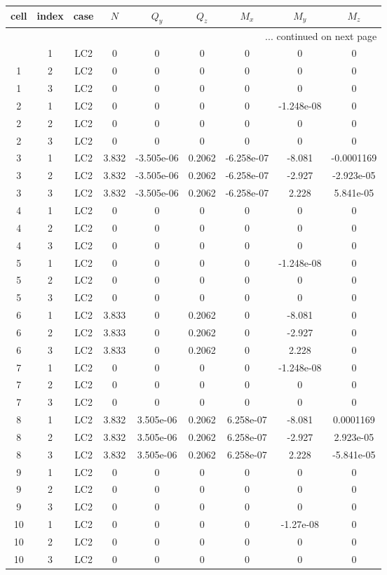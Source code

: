 \documentclass{article}%
\begin{document}
\begin{longtable}{| c c c | c c c c c c |}%
\hline%
cell&index&case&$N$&$Q_y$&$Q_z$&$M_x$&$M_y$&$M_z$\\%
\hline%
\endhead%
\hline%
\multicolumn{9}{r}{... continued on next page}\\%
\endfoot%
\hline%
\endlastfoot%
1&1&LC2&0&0&0&0&0&0\\%
1&2&LC2&0&0&0&0&0&0\\%
1&3&LC2&0&0&0&0&0&0\\%
2&1&LC2&0&0&0&0&{-}1.248e{-}08&0\\%
2&2&LC2&0&0&0&0&0&0\\%
2&3&LC2&0&0&0&0&0&0\\%
3&1&LC2&3.832&{-}3.505e{-}06&0.2062&{-}6.258e{-}07&{-}8.081&{-}0.0001169\\%
3&2&LC2&3.832&{-}3.505e{-}06&0.2062&{-}6.258e{-}07&{-}2.927&{-}2.923e{-}05\\%
3&3&LC2&3.832&{-}3.505e{-}06&0.2062&{-}6.258e{-}07&2.228&5.841e{-}05\\%
4&1&LC2&0&0&0&0&0&0\\%
4&2&LC2&0&0&0&0&0&0\\%
4&3&LC2&0&0&0&0&0&0\\%
5&1&LC2&0&0&0&0&{-}1.248e{-}08&0\\%
5&2&LC2&0&0&0&0&0&0\\%
5&3&LC2&0&0&0&0&0&0\\%
6&1&LC2&3.833&0&0.2062&0&{-}8.081&0\\%
6&2&LC2&3.833&0&0.2062&0&{-}2.927&0\\%
6&3&LC2&3.833&0&0.2062&0&2.228&0\\%
7&1&LC2&0&0&0&0&{-}1.248e{-}08&0\\%
7&2&LC2&0&0&0&0&0&0\\%
7&3&LC2&0&0&0&0&0&0\\%
8&1&LC2&3.832&3.505e{-}06&0.2062&6.258e{-}07&{-}8.081&0.0001169\\%
8&2&LC2&3.832&3.505e{-}06&0.2062&6.258e{-}07&{-}2.927&2.923e{-}05\\%
8&3&LC2&3.832&3.505e{-}06&0.2062&6.258e{-}07&2.228&{-}5.841e{-}05\\%
9&1&LC2&0&0&0&0&0&0\\%
9&2&LC2&0&0&0&0&0&0\\%
9&3&LC2&0&0&0&0&0&0\\%
10&1&LC2&0&0&0&0&{-}1.27e{-}08&0\\%
10&2&LC2&0&0&0&0&0&0\\%
10&3&LC2&0&0&0&0&0&0\\%

\end{longtable}
\end{document}
